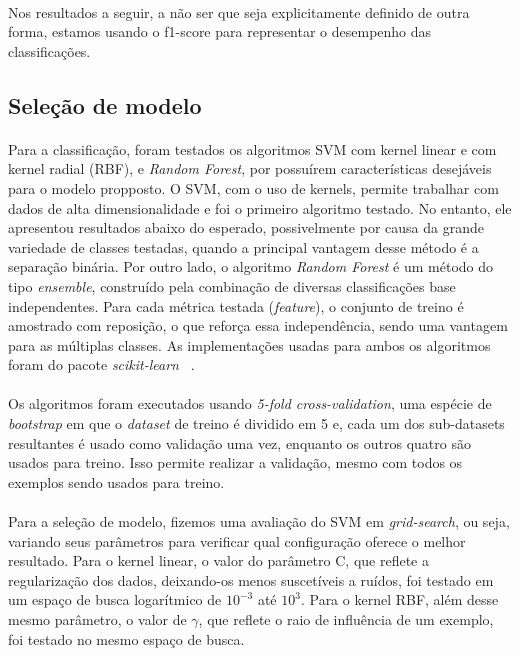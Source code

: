                 \paragraph{} Nos resultados a seguir, a não ser que seja explicitamente definido de outra forma, estamos usando o f1-score para representar o desempenho das classificações.

        \subsection{Seleção de modelo}
        
            \paragraph{} Para a classificação, foram testados os algoritmos SVM com kernel linear e com kernel radial (RBF), e \textit{Random Forest}, por possuírem características desejáveis para o modelo propposto. O SVM, com o uso de kernels, permite trabalhar com dados de alta dimensionalidade e foi o primeiro algoritmo testado. No entanto, ele apresentou resultados abaixo do esperado, possivelmente por causa da grande variedade de classes testadas, quando a principal vantagem desse método é a separação binária. Por outro lado, o algoritmo \textit{Random Forest} é um método do tipo \textit{ensemble}, construído pela combinação de diversas classificações base independentes. Para cada métrica testada (\textit{feature}), o conjunto de treino é amostrado com reposição, o que reforça essa independência, sendo uma vantagem para as múltiplas classes. As implementações usadas para ambos os algoritmos foram do pacote \textit{scikit-learn} ~\cite{scikit}.
            
            \paragraph{} Os algoritmos foram executados usando \textit{5-fold cross-validation}, uma espécie de \textit{bootstrap} em que o \textit{dataset} de treino é dividido em 5 e, cada um dos sub-datasets resultantes é usado como validação uma vez, enquanto os outros quatro são usados para treino. Isso permite realizar a validação, mesmo com todos os exemplos sendo usados para treino. 
            
            \paragraph{} Para a seleção de modelo, fizemos uma avaliação do SVM em \textit{grid-search}, ou seja, variando seus parâmetros para verificar qual configuração oferece o melhor resultado. Para o kernel linear, o valor do parâmetro C, que reflete a regularização dos dados, deixando-os menos suscetíveis a ruídos, foi testado em um espaço de busca logarítmico de $10^{-3}$ até $10^{3}$. Para o kernel RBF, além desse mesmo parâmetro, o valor de $\gamma$, que reflete o raio de influência de um exemplo, foi testado no mesmo espaço de busca.
            
